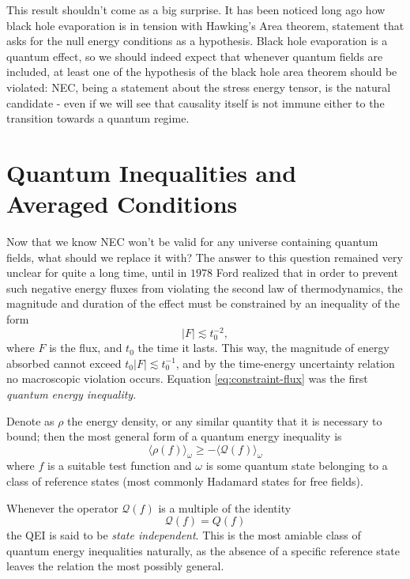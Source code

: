 This result shouldn't come as a big surprise. It has been noticed long ago how black hole evaporation is in tension with Hawking's Area theorem, statement that asks for the null energy conditions as a hypothesis. Black hole evaporation is a quantum effect, so we should indeed expect that whenever quantum fields are included, at least one of the hypothesis of the black hole area theorem should be violated: NEC, being a statement about the stress energy tensor, is the natural candidate - even if we will see that causality itself is not immune either to the transition towards a quantum regime.

\section{Quantum Inequalities and Averaged Conditions}
Now that we know NEC won't be valid for any universe containing quantum fields, what should we replace it with? The answer to this question remained very unclear for quite a long time, until in \(1978\) Ford \cite[]{ford1978quantum} realized that in order to prevent such negative energy fluxes from violating the second law of thermodynamics, the magnitude and duration of the effect must be constrained by an inequality of the form
\begin{equation}
    \label{eq:constraint-flux}
    \vert F \vert \lesssim t_0^{-2},    
\end{equation}
where \(F\) is the flux, and \(t_0\) the time it lasts. This way, the magnitude of energy absorbed cannot exceed \(t_0\vert F\vert \lesssim t_0^{-1}\), and by the time-energy uncertainty relation no macroscopic violation occurs. Equation \eqref{eq:constraint-flux} was the first \emph{quantum energy inequality}. 

Denote as \(\rho\) the energy density, or any similar quantity that it is necessary to bound; then the most general form of a quantum energy inequality is 
\[
\langle \rho(f) \rangle_{\omega} \ge - \langle \mathcal{Q}(f) \rangle_{\omega}   
\]
where \(f\) is a suitable test function and \(\omega\) is some quantum state belonging to a class of reference states (most commonly Hadamard states for free fields).

Whenever the operator \(\mathcal{Q}(f) \) is a multiple of the identity 
\[
    \mathcal{Q}(f) = Q(f)    
\]
the QEI is said to be \emph{state independent}. This is the most amiable class of quantum energy inequalities naturally, as the absence of a specific reference state leaves the relation the most possibly general.

